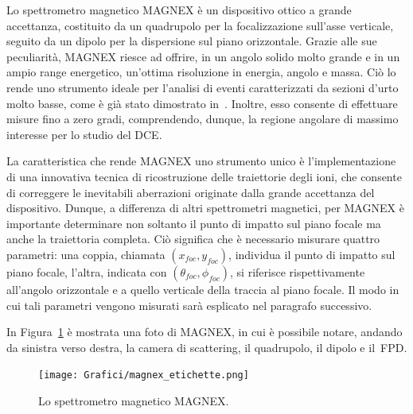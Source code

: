 Lo spettrometro magnetico MAGNEX è un dispositivo ottico a grande accettanza, costituito da un quadrupolo per la focalizzazione sull'asse verticale, seguito da un dipolo per la dispersione sul piano orizzontale.
Grazie alle sue peculiarità,  MAGNEX riesce ad offrire, in un angolo solido molto grande e in un ampio range energetico, un'ottima risoluzione in energia, angolo e massa.
Ciò lo rende uno strumento ideale per l'analisi di eventi caratterizzati da sezioni d'urto molto basse, come è già stato dimostrato in~\cite{cappuzzello:epja16,pereira:plb12,oliveira:jpg13}.
Inoltre, esso consente di effettuare misure fino a zero gradi, comprendendo, dunque, la regione angolare di massimo interesse per lo studio del DCE.

La caratteristica che rende MAGNEX uno strumento unico è l'implementazione di una innovativa tecnica di ricostruzione delle traiettorie degli ioni, che consente di correggere le inevitabili aberrazioni originate dalla grande accettanza del dispositivo.
Dunque, a differenza di altri spettrometri magnetici, per MAGNEX è importante determinare non soltanto il punto di impatto sul piano focale ma anche la traiettoria completa. Ciò significa che è necessario misurare quattro parametri: una coppia, chiamata $(x_{foc}, y_{foc})$, individua il punto di impatto sul piano focale, l'altra, indicata con $(\theta_{foc}, \phi_{foc})$, si riferisce rispettivamente all'angolo orizzontale e a quello verticale della traccia al piano focale.
Il modo in cui tali parametri vengono misurati sarà esplicato nel paragrafo successivo.

In Figura~\ref{fig:magnex} è mostrata una foto di MAGNEX, in cui è possibile notare, andando da sinistra verso destra, la camera di scattering, il quadrupolo, il dipolo e il~FPD.

\begin{figure} [!t]
	\centering
	\texttt{[image: Grafici/magnex\_etichette.png]}
	\caption{Lo spettrometro magnetico MAGNEX.} \label{fig:magnex}
\end{figure}




\subsection{} \label{sez:fpd}

